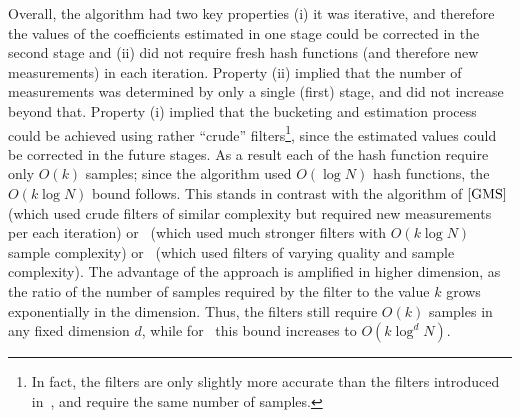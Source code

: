 Overall, the algorithm had two key properties (i) it was iterative, and therefore the values of the coefficients estimated in one stage could be corrected in the second stage and (ii) did not require fresh hash functions (and therefore new measurements) in each iteration. Property (ii) implied that the number of measurements was determined by only a single (first) stage, and did not increase beyond that. Property (i) implied that the bucketing and estimation process could be achieved using rather ``crude'' filters\footnote{In fact, the filters are only slightly more accurate than the filters introduced in~\cite{GMS}, and require the same number of samples.}, since the estimated values could be corrected in the future stages. As a result each of the hash function require only $O(k)$ samples;  since the algorithm used $O(\log N)$ hash functions, the $O(k \log N)$ bound follows. This stands in contrast with the algorithm of $\cite{GMS}$ (which used crude filters of similar complexity but required new measurements per each iteration) or~\cite{HIKP2} (which used much stronger filters with $O(k \log N)$ sample complexity) or~\cite{IKP} (which used filters of varying quality and sample complexity). The advantage of the approach is amplified in higher dimension, as the ratio of the number of samples required by the filter to the value $k$ grows exponentially in the dimension. Thus, the filters still require $O(k)$ samples in any fixed dimension $d$, while for~\cite{HIKP2, IKP} this bound increases to $O(k \log^d N)$. 
\fi 

